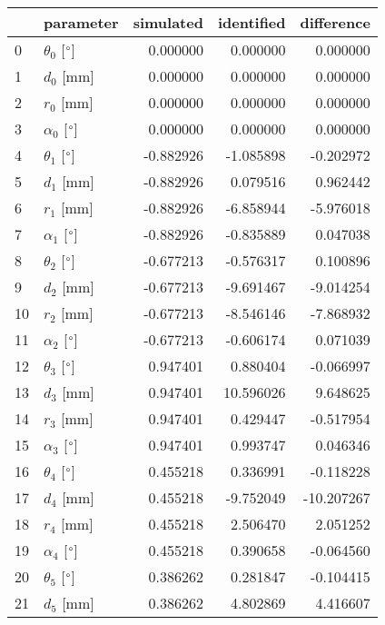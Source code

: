 \documentclass{standalone}%
\begin{document}
%
\normalsize%
\begin{tabular}{llrrr}
\toprule
{} &                 parameter & simulated & identified & difference \\
\midrule
0  &  $\theta_{0}$ [$\degree$] &  0.000000 &   0.000000 &   0.000000 \\
1  &              $d_{0}$ [mm] &  0.000000 &   0.000000 &   0.000000 \\
2  &              $r_{0}$ [mm] &  0.000000 &   0.000000 &   0.000000 \\
3  &  $\alpha_{0}$ [$\degree$] &  0.000000 &   0.000000 &   0.000000 \\
4  &  $\theta_{1}$ [$\degree$] & -0.882926 &  -1.085898 &  -0.202972 \\
5  &              $d_{1}$ [mm] & -0.882926 &   0.079516 &   0.962442 \\
6  &              $r_{1}$ [mm] & -0.882926 &  -6.858944 &  -5.976018 \\
7  &  $\alpha_{1}$ [$\degree$] & -0.882926 &  -0.835889 &   0.047038 \\
8  &  $\theta_{2}$ [$\degree$] & -0.677213 &  -0.576317 &   0.100896 \\
9  &              $d_{2}$ [mm] & -0.677213 &  -9.691467 &  -9.014254 \\
10 &              $r_{2}$ [mm] & -0.677213 &  -8.546146 &  -7.868932 \\
11 &  $\alpha_{2}$ [$\degree$] & -0.677213 &  -0.606174 &   0.071039 \\
12 &  $\theta_{3}$ [$\degree$] &  0.947401 &   0.880404 &  -0.066997 \\
13 &              $d_{3}$ [mm] &  0.947401 &  10.596026 &   9.648625 \\
14 &              $r_{3}$ [mm] &  0.947401 &   0.429447 &  -0.517954 \\
15 &  $\alpha_{3}$ [$\degree$] &  0.947401 &   0.993747 &   0.046346 \\
16 &  $\theta_{4}$ [$\degree$] &  0.455218 &   0.336991 &  -0.118228 \\
17 &              $d_{4}$ [mm] &  0.455218 &  -9.752049 & -10.207267 \\
18 &              $r_{4}$ [mm] &  0.455218 &   2.506470 &   2.051252 \\
19 &  $\alpha_{4}$ [$\degree$] &  0.455218 &   0.390658 &  -0.064560 \\
20 &  $\theta_{5}$ [$\degree$] &  0.386262 &   0.281847 &  -0.104415 \\
21 &              $d_{5}$ [mm] &  0.386262 &   4.802869 &   4.416607 \\

\end{tabular}
\end{document}
